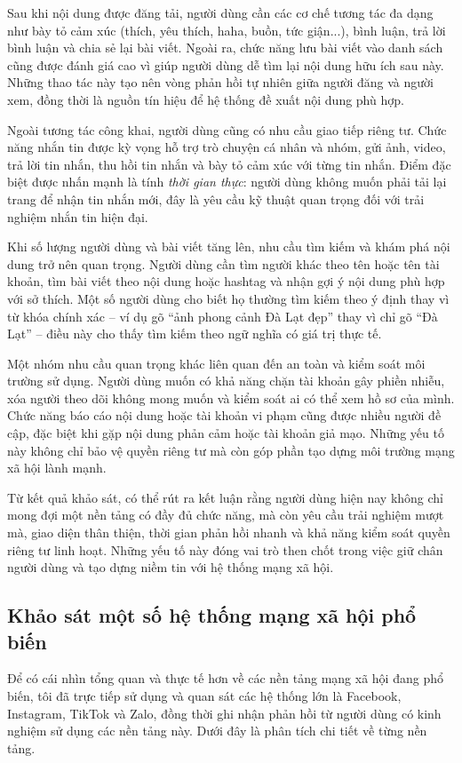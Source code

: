 \documentclass[../DoAn.tex]{subfiles}
\begin{document}
Sau khi nội dung được đăng tải, người dùng cần các cơ chế tương tác đa dạng như bày tỏ cảm xúc (thích, yêu thích, haha, buồn, tức giận...), bình luận, trả lời bình luận và chia sẻ lại bài viết. Ngoài ra, chức năng lưu bài viết vào danh sách cũng được đánh giá cao vì giúp người dùng dễ tìm lại nội dung hữu ích sau này. Những thao tác này tạo nên vòng phản hồi tự nhiên giữa người đăng và người xem, đồng thời là nguồn tín hiệu để hệ thống đề xuất nội dung phù hợp.

Ngoài tương tác công khai, người dùng cũng có nhu cầu giao tiếp riêng tư. Chức năng nhắn tin được kỳ vọng hỗ trợ trò chuyện cá nhân và nhóm, gửi ảnh, video, trả lời tin nhắn, thu hồi tin nhắn và bày tỏ cảm xúc với từng tin nhắn. Điểm đặc biệt được nhấn mạnh là tính \textit{thời gian thực}: người dùng không muốn phải tải lại trang để nhận tin nhắn mới, đây là yêu cầu kỹ thuật quan trọng đối với trải nghiệm nhắn tin hiện đại.

Khi số lượng người dùng và bài viết tăng lên, nhu cầu tìm kiếm và khám phá nội dung trở nên quan trọng. Người dùng cần tìm người khác theo tên hoặc tên tài khoản, tìm bài viết theo nội dung hoặc hashtag và nhận gợi ý nội dung phù hợp với sở thích. Một số người dùng cho biết họ thường tìm kiếm theo ý định thay vì từ khóa chính xác -- ví dụ gõ ``ảnh phong cảnh Đà Lạt đẹp'' thay vì chỉ gõ ``Đà Lạt'' -- điều này cho thấy tìm kiếm theo ngữ nghĩa có giá trị thực tế.

Một nhóm nhu cầu quan trọng khác liên quan đến an toàn và kiểm soát môi trường sử dụng. Người dùng muốn có khả năng chặn tài khoản gây phiền nhiễu, xóa người theo dõi không mong muốn và kiểm soát ai có thể xem hồ sơ của mình. Chức năng báo cáo nội dung hoặc tài khoản vi phạm cũng được nhiều người đề cập, đặc biệt khi gặp nội dung phản cảm hoặc tài khoản giả mạo. Những yếu tố này không chỉ bảo vệ quyền riêng tư mà còn góp phần tạo dựng môi trường mạng xã hội lành mạnh.

Từ kết quả khảo sát, có thể rút ra kết luận rằng người dùng hiện nay không chỉ mong đợi một nền tảng có đầy đủ chức năng, mà còn yêu cầu trải nghiệm mượt mà, giao diện thân thiện, thời gian phản hồi nhanh và khả năng kiểm soát quyền riêng tư linh hoạt. Những yếu tố này đóng vai trò then chốt trong việc giữ chân người dùng và tạo dựng niềm tin với hệ thống mạng xã hội.

\subsection{Khảo sát một số hệ thống mạng xã hội phổ biến}
\label{subsection:2.1.2}
Để có cái nhìn tổng quan và thực tế hơn về các nền tảng mạng xã hội đang phổ biến, tôi đã trực tiếp sử dụng và quan sát các hệ thống lớn là Facebook, Instagram, TikTok và Zalo, đồng thời ghi nhận phản hồi từ người dùng có kinh nghiệm sử dụng các nền tảng này. Dưới đây là phân tích chi tiết về từng nền tảng.
\end{document}
